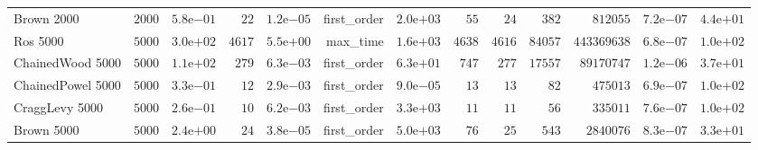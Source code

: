 \begin{longtable}[c]{lrrrrrrrrrrrr}
Brown 2000 & \( 2000\) & \( 5.8\)e\(-01\) & \(   22\) & \( 1.2\)e\(-05\) & first\_order & \( 2.0\)e\(+03\) & \(   55\) & \(   24\) & \(  382\) & \(812055\) & \( 7.2\)e\(-07\) & \( 4.4\)e\(+01\) \\
Ros 5000 & \( 5000\) & \( 3.0\)e\(+02\) & \( 4617\) & \( 5.5\)e\(+00\) & max\_time & \( 1.6\)e\(+03\) & \( 4638\) & \( 4616\) & \(84057\) & \(443369638\) & \( 6.8\)e\(-07\) & \( 1.0\)e\(+02\) \\
ChainedWood 5000 & \( 5000\) & \( 1.1\)e\(+02\) & \(  279\) & \( 6.3\)e\(-03\) & first\_order & \( 6.3\)e\(+01\) & \(  747\) & \(  277\) & \(17557\) & \(89170747\) & \( 1.2\)e\(-06\) & \( 3.7\)e\(+01\) \\
ChainedPowel 5000 & \( 5000\) & \( 3.3\)e\(-01\) & \(   12\) & \( 2.9\)e\(-03\) & first\_order & \( 9.0\)e\(-05\) & \(   13\) & \(   13\) & \(   82\) & \(475013\) & \( 6.9\)e\(-07\) & \( 1.0\)e\(+02\) \\
CraggLevy 5000 & \( 5000\) & \( 2.6\)e\(-01\) & \(   10\) & \( 6.2\)e\(-03\) & first\_order & \( 3.3\)e\(+03\) & \(   11\) & \(   11\) & \(   56\) & \(335011\) & \( 7.6\)e\(-07\) & \( 1.0\)e\(+02\) \\
Brown 5000 & \( 5000\) & \( 2.4\)e\(+00\) & \(   24\) & \( 3.8\)e\(-05\) & first\_order & \( 5.0\)e\(+03\) & \(   76\) & \(   25\) & \(  543\) & \(2840076\) & \( 8.3\)e\(-07\) & \( 3.3\)e\(+01\) \\
\hline 
\end{longtable}



